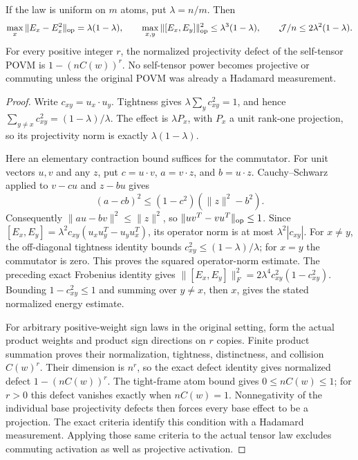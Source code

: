 \begin{theorem}
If the law is uniform on $m$ atoms, put $\lambda=n/m$. Then
\[
 \max_x\|E_x-E_x^2\|_{\rm op}=\lambda(1-\lambda),\qquad
 \max_{x,y}\|[E_x,E_y]\|_{\rm op}^2
 \le\lambda^3(1-\lambda),\qquad
 \mathcal J/n\le2\lambda^2(1-\lambda).
\]
For every positive integer $r$, the normalized projectivity defect
of the self-tensor POVM is $1-(nC(w))^r$.
No self-tensor power becomes projective or commuting unless the
original POVM was already a Hadamard measurement.
\end{theorem}
\begin{proof}
Write $c_{xy}=u_x\cdot u_y$. Tightness gives
$\lambda\sum_yc_{xy}^2=1$, and hence
$\sum_{y\ne x}c_{xy}^2=(1-\lambda)/\lambda$.
The effect is $\lambda P_x$, with $P_x$ a unit rank-one projection,
so its projectivity norm is exactly $\lambda(1-\lambda)$.

Here an elementary contraction bound suffices for the commutator.
For unit vectors $u,v$ and any $z$, put $c=u\cdot v$,
$a=v\cdot z$, and $b=u\cdot z$.
Cauchy--Schwarz applied to $v-cu$ and $z-bu$ gives
\[
 (a-cb)^2\le(1-c^2)(\|z\|^2-b^2).
\]
Consequently $\|au-bv\|^2\le\|z\|^2$, so
$\|uv^T-vu^T\|_{\rm op}\le1$.
Since $[E_x,E_y]=\lambda^2c_{xy}(u_xu_y^T-u_yu_x^T)$,
its operator norm is at most $\lambda^2|c_{xy}|$.
For $x\ne y$, the off-diagonal tightness identity bounds
$c_{xy}^2\le(1-\lambda)/\lambda$; for $x=y$ the commutator is zero.
This proves the squared operator-norm estimate.
The preceding exact Frobenius identity gives
$\|[E_x,E_y]\|_F^2=2\lambda^4c_{xy}^2(1-c_{xy}^2)$.
Bounding $1-c_{xy}^2\le1$ and summing over $y\ne x$, then $x$,
gives the stated normalized energy estimate.

For arbitrary positive-weight sign laws in the original setting,
form the actual product weights and product sign directions on $r$
copies. Finite product summation proves their normalization,
tightness, distinctness, and collision $C(w)^r$.
Their dimension is $n^r$, so the exact defect identity gives
normalized defect $1-(nC(w))^r$.
The tight-frame atom bound gives $0\le nC(w)\le1$; for $r>0$ this
defect vanishes exactly when $nC(w)=1$.
Nonnegativity of the individual base projectivity defects then
forces every base effect to be a projection. The exact criteria
identify this condition with a Hadamard measurement.
Applying those same criteria to the actual tensor law excludes
commuting activation as well as projective activation.
\end{proof}

